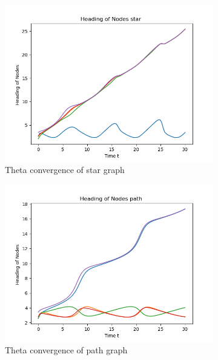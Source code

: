 \documentclass{article}
\begin{document}
\begin{problem}
\begin{figure}[!h]
\begin{subfigure}{0.35\textwidth}
        \end{subfigure}
        \begin{subfigure}{0.35\textwidth}
            \includegraphics[width=\textwidth]{./img/p3_star1.png}
            \caption{Theta convergence of star graph }
        \end{subfigure}
        \begin{subfigure}{0.35\textwidth}
            \includegraphics[width=\textwidth]{./img/p3_path1.png}
            \caption{Theta convergence of path graph }
        \end{subfigure}
        \begin{subfigure}{0.35\textwidth}

\end{subfigure}
\end{figure}
\end{problem}
\end{document}
